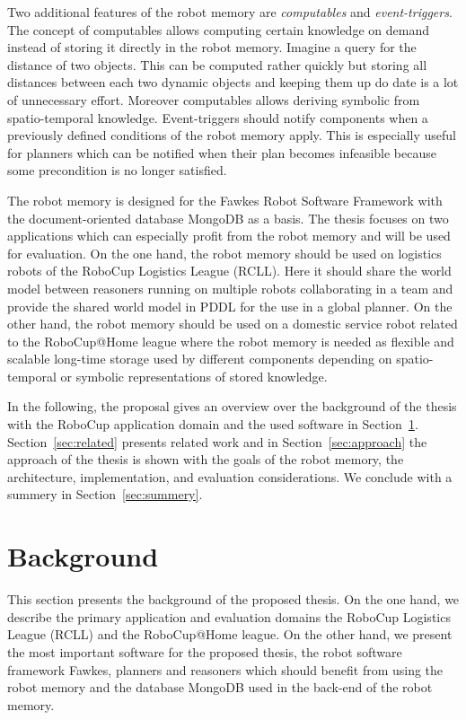 \documentclass[a4paper,11pt]{article}
\newcommand{\refsec}[1]{Section~\ref{#1}}
\begin{document}
Two additional features of the robot memory are
\emph{computables} and
\emph{event-triggers}.  The concept of computables allows
computing certain knowledge on demand instead of storing it directly
in the robot memory. Imagine a query for the distance of two
objects. This can be computed rather quickly but storing all distances
between each two dynamic objects and keeping them up do date is a lot
of unnecessary effort. Moreover computables allows deriving
symbolic from spatio-temporal knowledge.  Event-triggers should notify
components when a previously defined conditions of the robot memory
apply. This is especially useful for planners which can be notified
when their plan becomes infeasible because some precondition is no
longer satisfied.

The robot memory is designed for the Fawkes Robot Software Framework
with the document-oriented database MongoDB as a basis.  The thesis
focuses on two applications which can especially profit from the robot
memory and will be used for evaluation. On the one hand, the robot
memory should be used on logistics robots of the RoboCup Logistics
League (RCLL). Here it should share the world model between reasoners
running on multiple robots collaborating in a team and provide the
shared world model in PDDL for the use in a global planner. On the
other hand, the robot memory should be used on a domestic service
robot related to the RoboCup@Home league where the robot memory is
needed as flexible and scalable long-time storage used by different
components depending on spatio-temporal or symbolic representations of
stored knowledge.

In the following, the proposal gives an overview over the background
of the thesis with the RoboCup application domain and the used
software in \refsec{sec:background}. \refsec{sec:related} presents
related work and in \refsec{sec:approach} the approach of the thesis
is shown with the goals of the robot memory, the architecture,
implementation, and evaluation considerations. We conclude with a
summery in \refsec{sec:summery}.


\section{Background}
\label{sec:background}
This section presents the background of the proposed thesis. On the
one hand, we describe the primary application and evaluation domains
the RoboCup Logistics League (RCLL) and the RoboCup@Home league.
On the other hand, we present
the most important software for the proposed thesis,
the robot software framework Fawkes, planners and
reasoners which should benefit from using the robot memory and
the database MongoDB used in the back-end of the robot memory.
\end{document}
